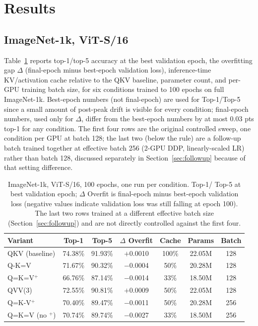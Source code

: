 \documentclass[11pt]{article}
\begin{document}
\section{Results}
\label{sec:results}

\subsection{ImageNet-1k, ViT-S/16}
Table~\ref{tab:imagenet1k} reports top-1/top-5 accuracy at the best
validation epoch, the overfitting gap \(\Delta\) (final-epoch minus
best-epoch validation loss), inference-time KV/activation cache relative to
the QKV baseline, parameter count, and per-GPU training batch size, for six
conditions trained to 100 epochs on full ImageNet-1k. Best-epoch numbers
(not final-epoch) are used for Top-1/Top-5 since a small amount of post-peak
drift is visible for every condition; final-epoch numbers, used only for
\(\Delta\), differ from the best-epoch numbers by at most 0.03 pts top-1 for
any condition. The first four rows are the original controlled sweep, one
condition per GPU at batch 128; the last two (below the rule) are a
follow-up batch trained together at effective batch 256 (2-GPU DDP,
linearly-scaled LR) rather than batch 128, discussed separately in
Section~\ref{sec:followup} because of that setting difference.

\begin{table}[h]
\centering
\caption{ImageNet-1k, ViT-S/16, 100 epochs, one run per condition. Top-1/
Top-5 at best validation epoch; \(\Delta\) Overfit is final-epoch minus
best-epoch validation loss (negative values indicate validation loss was
still falling at epoch 100). The last two rows trained at a different
effective batch size (Section~\ref{sec:followup}) and are not directly
controlled against the first four.}
\label{tab:imagenet1k}
\begin{tabular}{@{}lcccccc@{}}
\toprule
Variant & Top-1 & Top-5 & $\Delta$ Overfit & Cache & Params & Batch \\
\midrule
QKV (baseline) & 74.38\% & 91.93\% & $+$0.0010 & 100\% & 22.05M & 128 \\
Q-K=V          & 71.67\% & 90.32\% & $-$0.0004 & 50\%  & 20.28M & 128 \\
Q=K=V\(^+\)    & 66.76\% & 87.14\% & $-$0.0014 & 33\%  & 18.50M & 128 \\
QVV(3)         & 72.55\% & 90.81\% & $+$0.0009 & 50\%  & 22.05M & 128 \\
\midrule
Q=K-V\(^+\)     & 70.40\% & 89.47\% & $-$0.0011 & 50\% & 20.28M & 256 \\
Q=K=V (no $^+$) & 70.74\% & 89.74\% & $-$0.0027 & 33\% & 18.50M & 256 \\
\bottomrule
\end{tabular}
\end{table}
\end{document}

